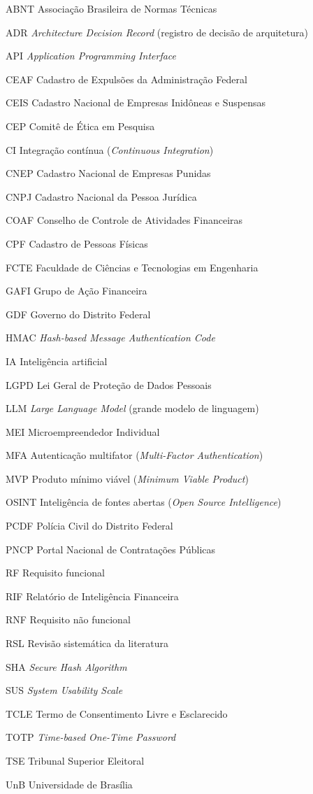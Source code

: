 \begin{siglas}
  \item[ABNT] Associação Brasileira de Normas Técnicas
  \item[ADR] \textit{Architecture Decision Record} (registro de decisão de arquitetura)
  \item[API] \textit{Application Programming Interface}
  \item[CEAF] Cadastro de Expulsões da Administração Federal
  \item[CEIS] Cadastro Nacional de Empresas Inidôneas e Suspensas
  \item[CEP] Comitê de Ética em Pesquisa
  \item[CI] Integração contínua (\textit{Continuous Integration})
  \item[CNEP] Cadastro Nacional de Empresas Punidas
  \item[CNPJ] Cadastro Nacional da Pessoa Jurídica
  \item[COAF] Conselho de Controle de Atividades Financeiras
  \item[CPF] Cadastro de Pessoas Físicas
  \item[FCTE] Faculdade de Ciências e Tecnologias em Engenharia
  \item[GAFI] Grupo de Ação Financeira
  \item[GDF] Governo do Distrito Federal
  \item[HMAC] \textit{Hash-based Message Authentication Code}
  \item[IA] Inteligência artificial
  \item[LGPD] Lei Geral de Proteção de Dados Pessoais
  \item[LLM] \textit{Large Language Model} (grande modelo de linguagem)
  \item[MEI] Microempreendedor Individual
  \item[MFA] Autenticação multifator (\textit{Multi-Factor Authentication})
  \item[MVP] Produto mínimo viável (\textit{Minimum Viable Product})
  \item[OSINT] Inteligência de fontes abertas (\textit{Open Source Intelligence})
  \item[PCDF] Polícia Civil do Distrito Federal
  \item[PNCP] Portal Nacional de Contratações Públicas
  \item[RF] Requisito funcional
  \item[RIF] Relatório de Inteligência Financeira
  \item[RNF] Requisito não funcional
  \item[RSL] Revisão sistemática da literatura
  \item[SHA] \textit{Secure Hash Algorithm}
  \item[SUS] \textit{System Usability Scale}
  \item[TCLE] Termo de Consentimento Livre e Esclarecido
  \item[TOTP] \textit{Time-based One-Time Password}
  \item[TSE] Tribunal Superior Eleitoral
  \item[UnB] Universidade de Brasília
\end{siglas}

